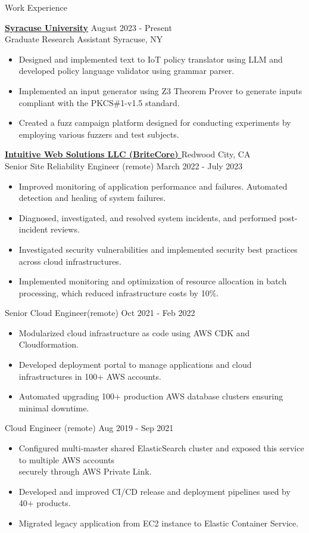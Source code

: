 \documentclass[12pt]{resume} %
\begin{document}
\begin{rSection}{Work Experience}

{\bf \href{https://ecs.syracuse.edu/}{Syracuse University}} \hfill August 2023 - Present \\
Graduate Research Assistant \hfill {Syracuse, NY}
\begin{itemize}
    \itemsep -3pt {} 
    \item Designed and implemented text to IoT policy translator using LLM and developed policy language validator using grammar parser.
    \item Implemented an input generator using Z3 Theorem Prover to generate inputs compliant with the PKCS\#1-v1.5 standard.
    \item Created a fuzz campaign platform designed for conducting experiments by employing various fuzzers and test subjects.\end{itemize}
{\bf\href{https://www.britecore.com/}{Intuitive Web Solutions LLC (BriteCore) }}\hfill Redwood City, CA \\
Senior Site Reliability Engineer (remote) \hfill March 2022 - July 2023
 \begin{itemize}
    \itemsep -3pt {} 
     \item Improved monitoring of application performance and failures. Automated detection and healing of system failures.
     \item Diagnosed, investigated, and resolved system incidents, and performed post-incident reviews.
     \item Investigated security vulnerabilities and implemented security best practices across cloud infrastructures.
    \item Implemented monitoring and optimization of resource allocation in batch processing, which reduced infrastructure costs by 10\%.
 \end{itemize}

Senior Cloud Engineer(remote) \hfill Oct 2021 - Feb 2022
 \begin{itemize}
    \itemsep -3pt {} 
     \item Modularized cloud infrastructure as code using AWS CDK and Cloudformation.
     \item Developed deployment portal to manage applications and cloud infrastructures in 100+ AWS accounts.
     \item Automated upgrading 100+ production AWS database clusters ensuring minimal downtime.
 \end{itemize}
Cloud Engineer (remote) \hfill Aug 2019 - Sep 2021
 \begin{itemize}
    \itemsep -3pt {} 
     \item Configured multi-master shared ElasticSearch cluster and exposed this service to multiple AWS accounts\\
     securely through AWS Private Link.
     \item Developed and improved CI/CD release and deployment pipelines used by 40+ products.
     \item Migrated legacy application from EC2 instance to Elastic Container Service.
 \end{itemize}


\end{rSection}
\end{document}
